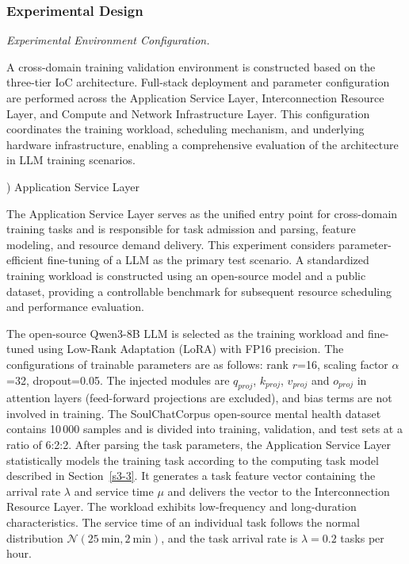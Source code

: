 \documentclass{ccjnl}
\begin{document}
\subsubsection{Experimental Design}
\label{s6-1-1}

\par
{}
\noindent\textit{Experimental Environment Configuration.}\par

A cross-domain training validation environment is constructed based on the three-tier IoC architecture. Full-stack deployment and parameter configuration are performed across the Application Service Layer, Interconnection Resource Layer, and Compute and Network Infrastructure Layer. This configuration coordinates the training workload, scheduling mechanism, and underlying hardware infrastructure, enabling a comprehensive evaluation of the architecture in LLM training scenarios.

) Application Service Layer

The Application Service Layer serves as the unified entry point for cross-domain training tasks and is responsible for task admission and parsing, feature modeling, and resource demand delivery. This experiment considers parameter-efficient fine-tuning of a LLM as the primary test scenario. A standardized training workload is constructed using an open-source model and a public dataset, providing a controllable benchmark for subsequent resource scheduling and performance evaluation.

The open-source Qwen3-8B LLM is selected as the training workload and fine-tuned using Low-Rank Adaptation (LoRA) with FP16 precision. The configurations of trainable parameters are as follows: rank $r$=16, scaling factor $\alpha$=32, dropout=0.05. The injected modules are $q_{proj}$, $k_{proj}$, $v_{proj}$ and $o_{proj}$ in attention layers (feed-forward projections are excluded), and bias terms are not involved in training. The SoulChatCorpus open-source mental health dataset contains 10\,000 samples and is divided into training, validation, and test sets at a ratio of 6:2:2. After parsing the task parameters, the Application Service Layer statistically models the training task according to the computing task model described in Section~\ref{s3-3}. It generates a task feature vector containing the arrival rate $\lambda$ and service time $\mu$ and delivers the vector to the Interconnection Resource Layer. The workload exhibits low-frequency and long-duration characteristics. The service time of an individual task follows the normal distribution $\mathcal{N}(25~\mathrm{min},2~\mathrm{min})$, and the task arrival rate is $\lambda=0.2$ tasks per hour.
\end{document}
